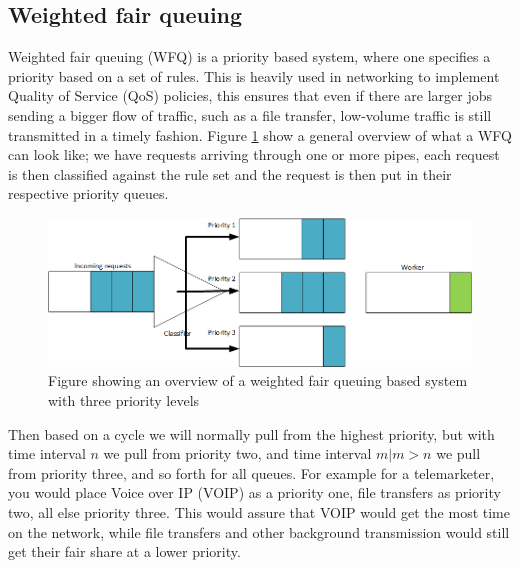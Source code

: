 \documentclass[../main.tex]{subfiles}
\begin{document}
\subsection{Weighted fair queuing}
Weighted fair queuing (WFQ) is a priority based system, where one specifies a priority based on a set of rules. This is heavily used in networking to implement Quality of Service (QoS) policies, this ensures that even if there are larger jobs sending a bigger flow of traffic, such as a file transfer, low-volume traffic is still transmitted in a timely fashion. \cite{cisco_wfq} Figure \ref{fig:wfq_drawing} show a general overview of what a WFQ can look like; we have requests arriving through one or more pipes, each request is then classified against the rule set and the request is then put in their respective priority queues.
\begin{figure}
    \centering
    \includegraphics[scale=.5]{img/WFQ_drawing.png}
    \caption{Figure showing an overview of a weighted fair queuing based system with three priority levels}
    \label{fig:wfq_drawing}
\end{figure}
Then based on a cycle we will normally pull from the highest priority, but with time interval $n$ we pull from priority two, and time interval $m | m>n$ we pull from priority three, and so forth for all queues. For example for a telemarketer, you would place Voice over IP (VOIP) as a priority one, file transfers as priority two, all else priority three. This would assure that VOIP would get the most time on the network, while file transfers and other background transmission would still get their fair share at a lower priority.
\end{document}

